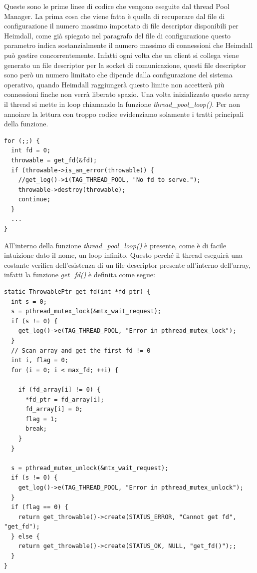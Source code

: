 \documentclass[italian]{tktltiki2}
\begin{document}
Queste sono le prime linee di codice che vengono eseguite dal thread Pool Manager. La prima cosa che viene fatta è quella di recuperare dal file di configurazione il numero massimo impostato di file descriptor disponibili per Heimdall, come già spiegato nel paragrafo del file di configurazione questo parametro indica sostanzialmente il numero massimo di connessioni che Heimdall può gestire concorrentemente. Infatti ogni volta che un client si collega viene generato un file descriptor per la socket di comunicazione, questi file descriptor sono però un numero limitato che dipende dalla configurazione del sistema operativo, quando Heimdall raggiungerà questo limite non accetterà più connessioni finche non verrà liberato spazio. Una volta inizializzato questo array il thread si mette in loop chiamando la funzione \emph{thread\_pool\_loop()}. Per non annoiare la lettura con troppo codice evidenziamo solamente i tratti principali della funzione.
\begin{lstlisting}
for (;;) {
  int fd = 0;
  throwable = get_fd(&fd);
  if (throwable->is_an_error(throwable)) {
    //get_log()->i(TAG_THREAD_POOL, "No fd to serve.");
    throwable->destroy(throwable);
    continue;
  }
  ...
}
\end{lstlisting}
All'interno della funzione \emph{thread\_pool\_loop()} è presente, come è di facile intuizione dato il nome, un loop infinito. Questo perché il thread eseguirà una costante verifica dell'esistenza di un file descriptor presente all'interno dell'array, infatti la funzione \emph{get\_fd()} è definita come segue:
\begin{lstlisting}
static ThrowablePtr get_fd(int *fd_ptr) {
  int s = 0;
  s = pthread_mutex_lock(&mtx_wait_request);
  if (s != 0) {
    get_log()->e(TAG_THREAD_POOL, "Error in pthread_mutex_lock");
  }
  // Scan array and get the first fd != 0
  int i, flag = 0;
  for (i = 0; i < max_fd; ++i) {

    if (fd_array[i] != 0) {
      *fd_ptr = fd_array[i];
      fd_array[i] = 0;
      flag = 1;
      break;
    }
  }

  s = pthread_mutex_unlock(&mtx_wait_request); 
  if (s != 0) {
    get_log()->e(TAG_THREAD_POOL, "Error in pthread_mutex_unlock");
  }
  if (flag == 0) {
    return get_throwable()->create(STATUS_ERROR, "Cannot get fd", "get_fd");
  } else {
    return get_throwable()->create(STATUS_OK, NULL, "get_fd()");;
  }
}
\end{lstlisting}
\end{document}
